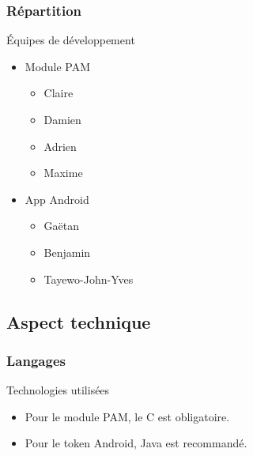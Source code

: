 \documentclass[xcolor=table]{beamer}
\begin{document}
\begin{frame}
\frametitle{Répartition}
\begin{block}{Équipes de développement}
  \begin{itemize}
    \item Module PAM
    \begin{itemize}
      \item Claire 
      \item Damien 
      \item Adrien 
      \item Maxime 
    \end{itemize}
    \item App Android
    \begin{itemize}
      \item Gaëtan 
      \item Benjamin 
      \item Tayewo-John-Yves 
    \end{itemize}
  \end{itemize}
\end{block}
\end{frame}




\subsection{Aspect technique}

\begin{frame}
\frametitle{Langages}
\begin{block}{Technologies utilisées}
\begin{itemize}
  \item Pour le module PAM, le C est obligatoire.
  \item Pour le token Android, Java est recommandé. 
\end{itemize}
\end{block}
\end{frame}
\end{document}
